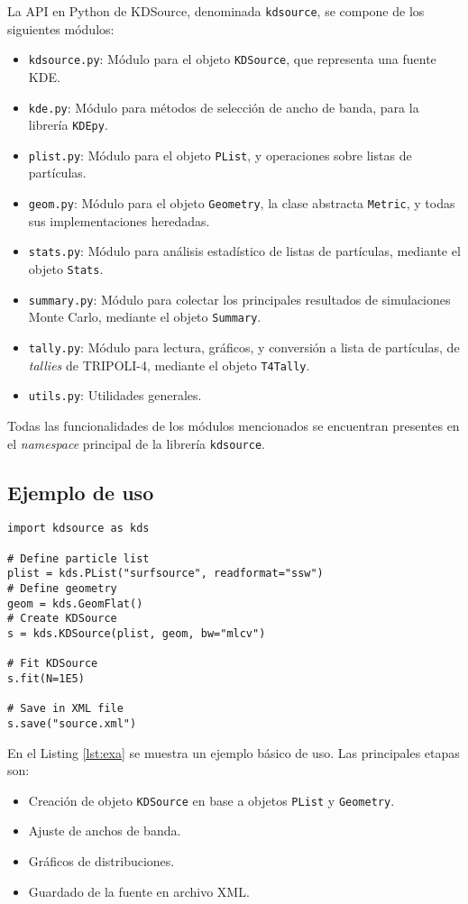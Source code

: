 La API en Python de KDSource, denominada \verb|kdsource|, se compone de los siguientes módulos:
\begin{itemize}
	\item \verb|kdsource.py|: Módulo para el objeto \verb|KDSource|, que representa una fuente KDE.
	\item \verb|kde.py|: Módulo para métodos de selección de ancho de banda, para la librería \verb|KDEpy|.
	\item \verb|plist.py|: Módulo para el objeto \verb|PList|, y operaciones sobre listas de partículas.
	\item \verb|geom.py|: Módulo para el objeto \verb|Geometry|, la clase abstracta \verb|Metric|, y todas sus implementaciones heredadas.
	\item \verb|stats.py|: Módulo para análisis estadístico de listas de partículas, mediante el objeto \verb|Stats|.
	\item \verb|summary.py|: Módulo para colectar los principales resultados de simulaciones Monte Carlo, mediante el objeto \verb|Summary|.
	\item \verb|tally.py|: Módulo para lectura, gráficos, y conversión a lista de partículas, de \emph{tallies} de TRIPOLI-4, mediante el objeto \verb|T4Tally|.
	\item \verb|utils.py|: Utilidades generales.
\end{itemize}

Todas las funcionalidades de los módulos mencionados se encuentran presentes en el \emph{namespace} principal de la librería \verb|kdsource|.


\subsection{Ejemplo de uso}

\begin{lstlisting}[language=Python2, label={lst:exa}, caption=Ejemplo básico de uso de API en Python.]
import kdsource as kds

# Define particle list
plist = kds.PList("surfsource", readformat="ssw")
# Define geometry
geom = kds.GeomFlat()
# Create KDSource
s = kds.KDSource(plist, geom, bw="mlcv")

# Fit KDSource
s.fit(N=1E5)

# Save in XML file
s.save("source.xml")
\end{lstlisting}

En el Listing \ref{lst:exa} se muestra un ejemplo básico de uso. Las principales etapas son:
\begin{itemize}
	\item Creación de objeto \verb|KDSource| en base a objetos \verb|PList| y \verb|Geometry|.
	\item Ajuste de anchos de banda.
	\item Gráficos de distribuciones.
	\item Guardado de la fuente en archivo XML.
\end{itemize}

